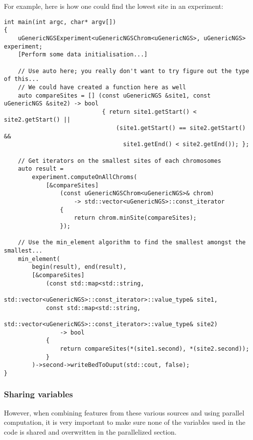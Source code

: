 \documentclass[letterpaper,10pt]{article}
\begin{document}
For example, here is how one could find the lowest site in an experiment:
\begin{verbatim}
int main(int argc, char* argv[])
{
    uGenericNGSExperiment<uGenericNGSChrom<uGenericNGS>, uGenericNGS> experiment;
    [Perform some data initialisation...]

    // Use auto here; you really don't want to try figure out the type of this...
    // We could have created a function here as well
    auto compareSites = [] (const uGenericNGS &site1, const uGenericNGS &site2) -> bool
                            { return site1.getStart() < site2.getStart() ||
                                (site1.getStart() == site2.getStart() &&
                                  site1.getEnd() < site2.getEnd()); };
  
    // Get iterators on the smallest sites of each chromosomes
    auto result =
        experiment.computeOnAllChroms(
            [&compareSites]
                (const uGenericNGSChrom<uGenericNGS>& chrom)
                    -> std::vector<uGenericNGS>::const_iterator
                {
                    return chrom.minSite(compareSites);
                });

    // Use the min_element algorithm to find the smallest amongst the smallest...
    min_element(
        begin(result), end(result),
        [&compareSites]
            (const std::map<std::string,
                            std::vector<uGenericNGS>::const_iterator>::value_type& site1,
            const std::map<std::string,
                            std::vector<uGenericNGS>::const_iterator>::value_type& site2)
                -> bool
            {
                return compareSites(*(site1.second), *(site2.second));
            }
        )->second->writeBedToOuput(std::cout, false);
}
\end{verbatim}

\subsubsection{Sharing variables}

However, when combining features from these various sources and using parallel computation, it is very important to make sure none of the variables used in the code is shared and overwritten in the parallelized section.
\end{document}
